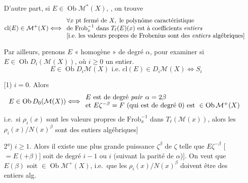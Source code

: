 \documentclass[11pt,a4paper]{article}
\begin{document}
D'autre part, si $E \in \operatorname{Ob} \mathcal{M}^{\ast}(X)$, \struck{\ill{}} , on trouve
\[
  \mathrm{cl}(E) \in \mathcal{M}^{+}(X) \Longleftrightarrow
  \begin{array}{l}
    \forall x \text{ pt fermé de } X, \text{ le polynôme caractéristique} \\
    \text{de }\mathrm{Frob}_{x}^{-1}\text{ dans }T_{\ell}(E)(x)\text{ est à coefficients \textit{entiers}} \\
    \text{[i.e.\ les valeurs propres de Frobenius sont des \textit{entiers} algébriques]}
  \end{array}
\]

Par ailleurs, prenons  $E$ « homogène » de degré $\alpha$, pour examiner si $E \in \operatorname{Ob} D_{i}(\mathcal{M}(X))$, où $i \geq 0$ \struck{\ill{}, \ill{}} un entier.
\[
  \boxed{E \in \operatorname{Ob} D_{i}\mathcal{M}(X) \text{ i.e.\ } \mathrm{cl}(E) \in D_{i}\mathcal{M}(X) \Longleftrightarrow S_{i}}
\]

[1) $i = 0$. Alors
\[
  E \in \operatorname{Ob} D_{0}(\mathcal{M}(X)) \Longleftrightarrow
  \begin{array}{l}
    E\text{ est de degré \textit{pair} }\alpha = 2\beta \\
    \text{et }E\zeta^{-\beta} = F\text{ (qui est de degré }0\text{) est }\in \operatorname{Ob} \mathcal{M}^{+}(X)\text{}
  \end{array}
\]
i.e.\ si $\rho_{i}(x)$ sont les valeurs propres de $\mathrm{Frob}_{x}^{-1}$ dans $T_{\ell}(\mathcal{M}(x))$, alors les $\rho_{i}(x)/N(x)^{\beta}$ sont des entiers algébriques]


2°) $i \geq 1$. Alors il existe une plus grande puissance $\zeta^{\beta}$ de $\zeta$ telle que $E\zeta^{-\beta}$ \struck{\ill{}} [$= E(+\beta)$] soit de degré $i-1$ ou $i$ (suivant la parité de $\alpha$)]. On veut que $E(\beta)$ soit $\in \operatorname{Ob} \mathcal{M}^{+}(X)$, i.e.\ que les $\rho_{i}(x)/N(x)^{\beta}$ doivent être des entiers alg.
\end{document}
